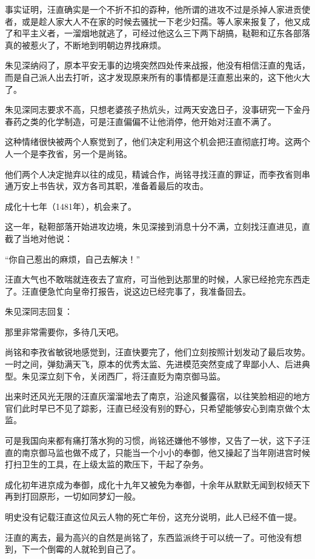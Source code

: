 \begin{multicols}{\theparacolNo}
事实证明，汪直确实是一个不折不扣的孬种，他所谓的进攻不过是杀掉人家进贡使者，或是趁人家大人不在家的时候去骚扰一下老少妇孺。等人家来报复了，他又成了和平主义者，一溜烟地就逃了，可经过他这么三下两下胡搞，鞑靼和辽东各部落真的被惹火了，不断地到明朝边界找麻烦。

朱见深纳闷了，原本平安无事的边境突然四处传来战报，他没有相信汪直的鬼话，而是自己派人出去打听，这才发现原来所有的事情都是汪直惹出来的，这下他火大了。

朱见深同志要求不高，只想老婆孩子热炕头，过两天安逸日子，没事研究一下金丹春药之类的化学制造，可是汪直偏偏不让他消停，他开始对汪直不满了。

这种情绪很快被两个人察觉到了，他们决定利用这个机会把汪直彻底打垮。这两个人一个是李孜省，另一个是尚铭。

他们两个人决定抛弃以往的成见，精诚合作，尚铭寻找汪直的罪证，而李孜省则串通万安上书告状，双方各司其职，准备着最后的攻击。

成化十七年（1481年），机会来了。

这一年，鞑靼部落开始进攻边境，朱见深接到消息十分不满，立刻找汪直进见，直截了当地对他说：

“你自己惹出的麻烦，自己去解决！”

汪直大气也不敢喘就连夜去了宣府，可当他到达那里的时候，人家已经抢完东西走了。汪直便急忙向皇帝打报告，说这边已经完事了，我准备回去。

朱见深同志回复：

那里非常需要你，多待几天吧。

尚铭和李孜省敏锐地感觉到，汪直快要完了，他们立刻按照计划发动了最后攻势。一时之间，弹劾满天飞，原本的优秀太监、先进模范突然变成了卑鄙小人、后进典型。朱见深立刻下令，关闭西厂，将汪直贬为南京御马监。

出来时还风光无限的汪直灰溜溜地去了南京，沿途风餐露宿，以往笑脸相迎的地方官们此时早已不见了踪影，汪直已经没有别的野心，只希望能够安心到南京做个太监。

可是我国向来都有痛打落水狗的习惯，尚铭还嫌他不够惨，又告了一状，这下子汪直的南京御马监也做不成了，只能当一个小小的奉御，他又操起了当年刚进宫时候打扫卫生的工具，在上级太监的欺压下，干起了杂务。

成化初年进京成为奉御，成化十九年又被免为奉御，十余年从默默无闻到权倾天下再到打回原形，一切如同梦幻一般。

明史没有记载汪直这位风云人物的死亡年份，这充分说明，此人已经不值一提。

汪直的离去，最为高兴的自然是尚铭了，东西监派终于可以统一了。可他没有想到，下一个倒霉的人就轮到自己了。


\end{multicols}
